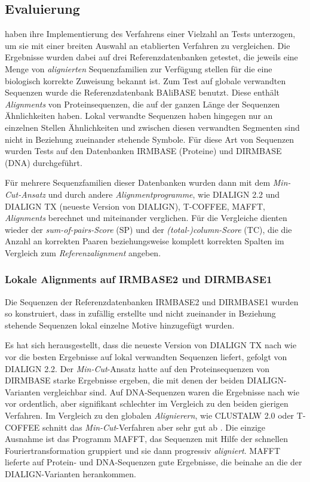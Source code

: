 \subsection{Evaluierung}

\cite{cpm10} haben ihre Implementierung des Verfahrens einer Vielzahl an Tests unterzogen, um sie mit einer breiten Auswahl an etablierten Verfahren zu vergleichen. Die Ergebnisse wurden dabei auf drei Referenzdatenbanken getestet, die jeweils eine Menge von \emph{alignierten} Sequenzfamilien zur Verfügung stellen für die eine biologisch korrekte Zuweisung bekannt ist. Zum Test auf globale verwandten Sequenzen wurde die Referenzdatenbank BAliBASE benutzt. Diese enthält \emph{Alignments} von Proteinsequenzen, die auf der ganzen Länge der Sequenzen Ähnlichkeiten haben. Lokal verwandte Sequenzen haben hingegen nur an einzelnen Stellen Ähnlichkeiten und zwischen diesen verwandten Segmenten sind nicht in Beziehung zueinander stehende Symbole. Für diese Art von Sequenzen wurden Tests auf den Datenbanken IRMBASE (Proteine) und DIRMBASE (DNA) durchgeführt.

Für mehrere Sequenzfamilien dieser Datenbanken wurden dann mit dem \emph{Min-Cut-Ansatz} und durch andere \emph{Alignmentprogramme}, wie DIALIGN 2.2 und DIALIGN TX (neueste Version von DIALIGN), T-COFFEE, MAFFT, \emph{Alignments} berechnet und miteinander verglichen. Für die Vergleiche dienten wieder der \emph{sum-of-pairs-Score} (SP) und der \emph{(total-)column-Score} (TC), die die Anzahl an korrekten Paaren beziehungsweise komplett korrekten Spalten im Vergleich zum \emph{Referenzalignment} angeben.

\subsubsection{Lokale Alignments auf IRMBASE2 und DIRMBASE1}

Die Sequenzen der Referenzdatenbanken IRMBASE2 und DIRMBASE1 wurden so konstruiert, dass in zufällig erstellte und nicht zueinander in Beziehung stehende Sequenzen lokal einzelne Motive hinzugefügt wurden.

Es hat sich herausgestellt, dass die neueste Version von DIALIGN TX nach wie vor die besten Ergebnisse auf lokal verwandten Sequenzen liefert, gefolgt von DIALIGN 2.2. Der \emph{Min-Cut}-Ansatz hatte auf den Proteinsequenzen von DIRMBASE starke Ergebnisse ergeben, die mit denen der beiden DIALIGN-Varianten vergleichbar sind. Auf DNA-Sequenzen waren die Ergebnisse nach wie vor ordentlich, aber signifikant schlechter im Vergleich zu den beiden gierigen Verfahren. Im Vergleich zu den globalen \emph{Alignierern}, wie CLUSTALW 2.0 oder T-COFFEE schnitt das \emph{Min-Cut}-Verfahren aber sehr gut ab \citep{cpm10}. Die einzige Ausnahme ist das Programm MAFFT, das Sequenzen mit Hilfe der schnellen Fouriertransformation gruppiert und sie dann progressiv \emph{aligniert}. MAFFT lieferte auf Protein- und DNA-Sequenzen gute Ergebnisse, die beinahe an die der DIALIGN-Varianten herankommen.

